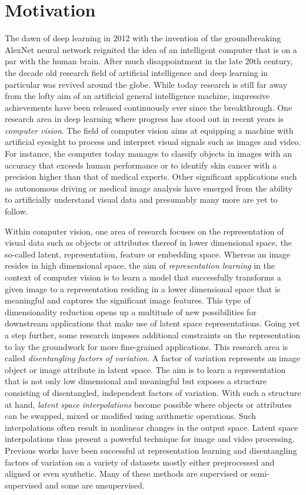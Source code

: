 \documentclass[a4paper,12pt]{report}
\begin{document}
\section{Motivation}
The dawn of deep learning in 2012 with the invention of the groundbreaking AlexNet neural network reignited the idea of an intelligent computer that is on a par with the human brain. After much disappointment in the late 20th century, the decade old research field of artificial intelligence and deep learning in particular was revived around the globe. While today research is still far away from the lofty aim of an artificial general intelligence machine, impressive achievements have been released continuously ever since the breakthrough. One research area in deep learning where progress has stood out in recent years is \textit{computer vision}. The field of computer vision aims at equipping a machine with artificial eyesight to process and interpret visual signals such as images and video. For instance, the computer today manages to classify objects in images with an accuracy that exceeds human performance or to identify skin cancer with a precision higher than that of medical experts. Other significant applications such as autonomous driving or medical image analysis have emerged from the ability to artificially understand visual data and presumably many more are yet to follow. 

Within computer vision, one area of research focuses on the representation of visual data such as objects or attributes thereof in lower dimensional space, the so-called latent, representation, feature or embedding space. Whereas an image resides in high dimensional space, the aim of \textit{representation learning} in the context of computer vision is to learn a model that successfully transforms a given image to a representation residing in a lower dimensional space that is meaningful and captures the significant image features. This type of dimensionality reduction opens up a multitude of new possibilities for downstream applications that make use of latent space representations. Going yet a step further, some research imposes additional constraints on the representation to lay the groundwork for more fine-grained applications. This research area is called \textit{disentangling factors of variation}. A factor of variation represents an image object or image attribute in latent space. The aim is to learn a representation that is not only low dimensional and meaningful but exposes a structure consisting of disentangled, independent factors of variation. With such a structure at hand, \textit{latent space interpolations} become possible where objects or attributes can be swapped, mixed or modified using arithmetic operations. Such interpolations often result in nonlinear changes in the output space. Latent space interpolations thus present a powerful technique for image and video processing. Previous works have been successful at representation learning and disentangling factors of variation on a variety of datasets mostly either preprocessed and aligned or even synthetic. Many of these methods are supervised or semi-supervised and some are unsupervised.
\end{document}
